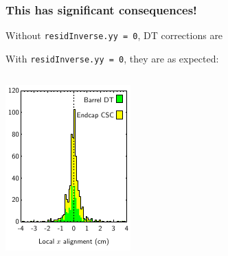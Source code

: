 \documentclass[compress]{beamer}
\begin{document}
\begin{frame}
\frametitle{This has significant consequences!}

Without {\tt residInverse.yy = 0}, DT corrections are \textcolor{red}{}

\vfill
With {\tt residInverse.yy = 0}, they are as expected:

\vfill
\begin{columns}
\includegraphics[width=\linewidth]{init_alignments_x}


\end{columns}
\end{frame}
\end{document}

